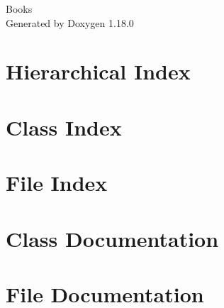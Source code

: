 \documentclass[twoside]{book}
\newcommand{\+}{\discretionary{\mbox{\scriptsize$\hookleftarrow$}}{}{}}
\newcommand{\clearemptydoublepage}{%
    \newpage{\pagestyle{empty}\cleardoublepage}%
  }
\begin{document}
  \raggedbottom
    \hypersetup{pageanchor=false,
                bookmarksnumbered=true,
                pdfencoding=unicode
               }
  \begin{titlepage}
  \vspace*{7cm}
  \begin{center}%
  {\Large Books}\\
  \vspace*{1cm}
  {\large Generated by Doxygen 1.18.0}\\
  \end{center}
  \end{titlepage}
  \clearemptydoublepage
  \tableofcontents
  \clearemptydoublepage
  \hypersetup{pageanchor=true}
\chapter{Hierarchical Index}

\chapter{Class Index}

\chapter{File Index}

\chapter{Class Documentation}














\chapter{File Documentation}






  \backmatter
  \newpage
  \clearemptydoublepage
  \printindex
\end{document}
